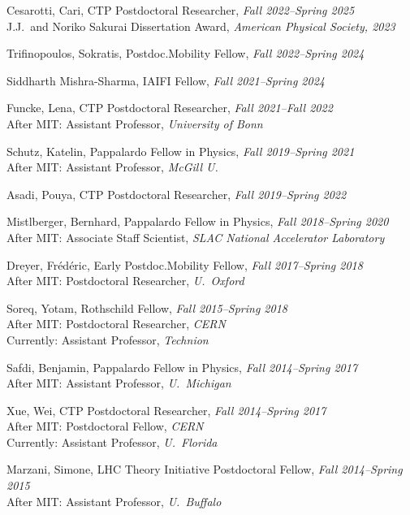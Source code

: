 \documentclass[11pt]{article}
\newcommand{\sh}{\phantom{.....}}
\begin{document}
\item  Cesarotti, Cari, CTP Postdoctoral Researcher, \textit{Fall 2022--Spring 2025}
\\ \sh J.J.\ and Noriko Sakurai Dissertation Award, \textit{American Physical Society, 2023}
\item Trifinopoulos, Sokratis, Postdoc.Mobility Fellow, \textit{Fall 2022--Spring 2024}
\item Siddharth Mishra-Sharma, IAIFI Fellow, \textit{Fall 2021--Spring 2024}
\item Funcke, Lena, CTP Postdoctoral Researcher, \textit{Fall 2021--Fall 2022}
\\ \sh After MIT: Assistant Professor, \textit{University of Bonn}
\item Schutz, Katelin, Pappalardo Fellow in Physics, \textit{Fall 2019--Spring 2021}
\\ \sh After MIT:  Assistant Professor, \textit{McGill U.}
\item Asadi, Pouya, CTP Postdoctoral Researcher, \textit{Fall 2019--Spring 2022}
\item Mistlberger, Bernhard, Pappalardo Fellow in Physics, \textit{Fall 2018--Spring 2020}
\\ \sh After MIT: Associate Staff Scientist, \textit{SLAC National Accelerator Laboratory}
\item Dreyer, Fr\'ed\'eric, Early Postdoc.Mobility Fellow, \textit{Fall 2017--Spring 2018}
\\ \sh After MIT: Postdoctoral Researcher, \textit{U.~Oxford}
\item Soreq, Yotam, Rothschild Fellow, \textit{Fall 2015--Spring 2018}
\\ \sh After MIT: Postdoctoral Researcher, \textit{CERN}
\\ \sh Currently:  Assistant Professor, \textit{Technion}
\item Safdi, Benjamin, Pappalardo Fellow in Physics, \textit{Fall 2014--Spring 2017}
\\ \sh After MIT:  Assistant Professor, \textit{U.~Michigan}
\item Xue, Wei, CTP Postdoctoral Researcher, \textit{Fall 2014--Spring 2017}
\\ \sh After MIT: Postdoctoral Fellow, \textit{CERN}
\\ \sh Currently:  Assistant Professor, \textit{U.~Florida}
\item Marzani, Simone, LHC Theory Initiative Postdoctoral Fellow, \textit{Fall 2014--Spring 2015}
\\ \sh After MIT:  Assistant Professor, \textit{U.~Buffalo}
\end{document}

